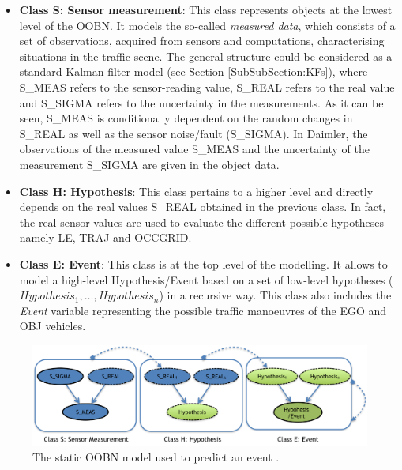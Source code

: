 \begin{itemize}
\item \textbf{Class S: Sensor measurement}: This class represents objects at the lowest level of the OOBN. It models the so-called \textit{measured data}, which consists of a set of observations, acquired from sensors and computations, characterising situations in the traffic scene. The general structure could be considered as a standard Kalman filter model (see Section \ref{SubSubSection:KFs}), where S\_MEAS refers to the sensor-reading value, S\_REAL refers to the real value and S\_SIGMA refers to the uncertainty in the measurements. As it can be seen, S\_MEAS is conditionally dependent on the random changes in S\_REAL as well as the sensor noise/fault (S\_SIGMA). In Daimler, the observations of the measured value S\_MEAS and the uncertainty of the measurement S\_SIGMA are given in the object data. 

\item \textbf{Class H: Hypothesis}: This class pertains to a higher level and directly depends on the real values S\_REAL obtained in the previous class. In fact, the real sensor values are used to evaluate the different possible hypotheses namely LE, TRAJ and OCCGRID. 

\item \textbf{Class E: Event}: This class is at the top level of the modelling. It allows to model a high-level Hypothesis/Event based on a set of low-level hypotheses ($Hypothesis_1, \ldots, Hypothesis_n$) in a recursive way. This class also includes the \textit{Event} variable representing the possible traffic manoeuvres of the EGO and OBJ vehicles. 

\end{itemize}

\begin{figure}[ht!]
\begin{center}
\includegraphics[scale=0.48]{./figures/DaimlerOOBNAbstraction}
\caption{\label{Figure:DaimlerOOBNAbstraction} The static OOBN model used to predict an event \cite{Weidl2014}.}
\end{center}
\end{figure}


